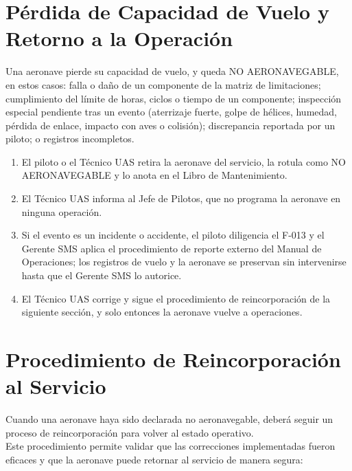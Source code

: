 \section{Pérdida de Capacidad de Vuelo y Retorno a la Operación}
Una aeronave pierde su capacidad de vuelo, y queda NO AERONAVEGABLE, en estos casos: falla o daño de un componente de la matriz de limitaciones; cumplimiento del límite de horas, ciclos o tiempo de un componente; inspección especial pendiente tras un evento (aterrizaje fuerte, golpe de hélices, humedad, pérdida de enlace, impacto con aves o colisión); discrepancia reportada por un piloto; o registros incompletos.
\begin{enumerate}
    \item El piloto o el Técnico UAS retira la aeronave del servicio, la rotula como NO AERONAVEGABLE y lo anota en el Libro de Mantenimiento.
    \item El Técnico UAS informa al Jefe de Pilotos, que no programa la aeronave en ninguna operación.
    \item Si el evento es un incidente o accidente, el piloto diligencia el F-013 y el Gerente SMS aplica el procedimiento de reporte externo del Manual de Operaciones; los registros de vuelo y la aeronave se preservan sin intervenirse hasta que el Gerente SMS lo autorice.
    \item El Técnico UAS corrige y sigue el procedimiento de reincorporación de la siguiente sección, y solo entonces la aeronave vuelve a operaciones.
\end{enumerate}

\section{Procedimiento de Reincorporación al Servicio}
Cuando una aeronave haya sido declarada no aeronavegable, deberá seguir un proceso de reincorporación para volver al estado operativo.\\

Este procedimiento permite validar que las correcciones implementadas fueron eficaces y que la aeronave puede retornar al servicio de manera segura:

